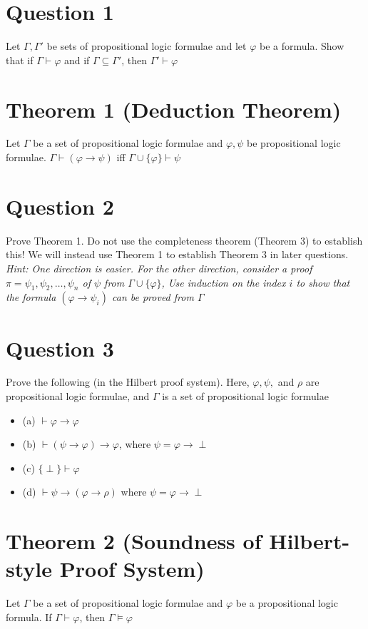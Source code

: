 \documentclass{article}
\begin{document}
\section*{Question 1}
Let $\Gamma, \Gamma'$ be sets of propositional logic formulae and let $\varphi$ be a formula. Show that if $\Gamma \vdash \varphi$ and if $\Gamma \subseteq \Gamma'$, then $\Gamma' \vdash \varphi$

\section*{Theorem 1 (Deduction Theorem)}
Let $\Gamma$ be a set of propositional logic formulae and $\varphi, \psi$ be propositional logic formulae. $\Gamma \vdash (\varphi \rightarrow \psi)$ iff $\Gamma \cup \{\varphi\} \vdash \psi$

\section*{Question 2}
Prove Theorem 1. Do not use the completeness theorem (Theorem 3) to establish this! We will instead use Theorem 1 to establish Theorem 3 in later questions. \textit{Hint: One direction is easier. For the other direction, consider a proof $\pi = \psi_1, \psi_2, \dots, \psi_n$ of $\psi$ from $\Gamma \cup \{\varphi\}$, 
Use induction on the index $i$ to show that the formula $(\varphi \rightarrow \psi_i)$ can be proved from $\Gamma$}

\section*{Question 3}
Prove the following (in the Hilbert proof system). Here, $\varphi, \psi,$ and $\rho$ are propositional logic formulae, and $\Gamma$ is a set of propositional logic formulae
\begin{itemize}
    \item (a) $\vdash \varphi \rightarrow \varphi$ 
    \item (b) $\vdash (\psi \rightarrow \varphi) \rightarrow \varphi$, where $\psi = \varphi \rightarrow \perp$
    \item (c) $\{\perp\} \vdash \varphi$ 
    \item (d) $\vdash \psi \rightarrow (\varphi \rightarrow \rho)$ where $\psi = \varphi \rightarrow \perp$
\end{itemize}

\section*{Theorem 2 (Soundness of Hilbert-style Proof System)}
Let $\Gamma$ be a set of propositional logic formulae and $\varphi$ be a propositional logic formula. If $\Gamma \vdash \varphi$, then $\Gamma \models \varphi$
\end{document}
